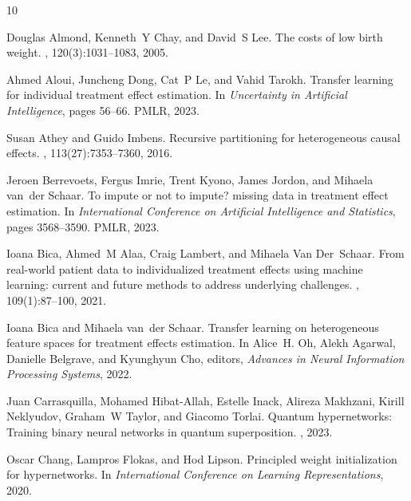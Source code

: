 \documentclass{article}
\begin{document}
%
\begin{thebibliography}{10}
	
	Douglas Almond, Kenneth~Y Chay, and David~S Lee.
	\newblock The costs of low birth weight.
	, 120(3):1031--1083, 2005.
	
	Ahmed Aloui, Juncheng Dong, Cat~P Le, and Vahid Tarokh.
	\newblock Transfer learning for individual treatment effect estimation.
	\newblock In {\em Uncertainty in Artificial Intelligence}, pages 56--66. PMLR,
	2023.
	
	Susan Athey and Guido Imbens.
	\newblock Recursive partitioning for heterogeneous causal effects.
	,
	113(27):7353--7360, 2016.
	
	Jeroen Berrevoets, Fergus Imrie, Trent Kyono, James Jordon, and Mihaela van~der
	Schaar.
	\newblock To impute or not to impute? missing data in treatment effect
	estimation.
	\newblock In {\em International Conference on Artificial Intelligence and
		Statistics}, pages 3568--3590. PMLR, 2023.
	
	Ioana Bica, Ahmed~M Alaa, Craig Lambert, and Mihaela Van Der~Schaar.
	\newblock From real-world patient data to individualized treatment effects
	using machine learning: current and future methods to address underlying
	challenges.
	, 109(1):87--100, 2021.
	
	Ioana Bica and Mihaela van~der Schaar.
	\newblock Transfer learning on heterogeneous feature spaces for treatment
	effects estimation.
	\newblock In Alice~H. Oh, Alekh Agarwal, Danielle Belgrave, and Kyunghyun Cho,
	editors, {\em Advances in Neural Information Processing Systems}, 2022.
	
	Juan Carrasquilla, Mohamed Hibat-Allah, Estelle Inack, Alireza Makhzani, Kirill
	Neklyudov, Graham~W Taylor, and Giacomo Torlai.
	\newblock Quantum hypernetworks: Training binary neural networks in quantum
	superposition.
	, 2023.
	
	Oscar Chang, Lampros Flokas, and Hod Lipson.
	\newblock Principled weight initialization for hypernetworks.
	\newblock In {\em International Conference on Learning Representations}, 2020.
	

\end{thebibliography}
\end{document}
